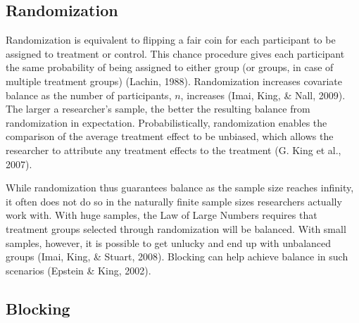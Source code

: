 \documentclass[12pt,econ]{sources/authesis}
\begin{document}
\hypertarget{ordblock-theory-randomization}{%
\subsection{Randomization}\label{ordblock-theory-randomization}}

Randomization is equivalent to flipping a fair coin for each participant to be assigned to treatment or control. This chance procedure gives each participant the same probability of being assigned to either group (or groups, in case of multiple treatment groups) (Lachin, 1988). Randomization increases covariate balance as the number of participants, \(n\), increases (Imai, King, \& Nall, 2009). The larger a researcher's sample, the better the resulting balance from randomization in expectation. Probabilistically, randomization enables the comparison of the average treatment effect to be unbiased, which allows the researcher to attribute any treatment effects to the treatment (G. King et al., 2007).

While randomization thus guarantees balance as the sample size reaches infinity, it often does not do so in the naturally finite sample sizes researchers actually work with. With huge samples, the Law of Large Numbers requires that treatment groups selected through randomization will be balanced. With small samples, however, it is possible to get unlucky and end up with unbalanced groups (Imai, King, \& Stuart, 2008). Blocking can help achieve balance in such scenarios (Epstein \& King, 2002).

\hypertarget{ordblock-theory-blocking}{%
\subsection{Blocking}\label{ordblock-theory-blocking}}
\end{document}
